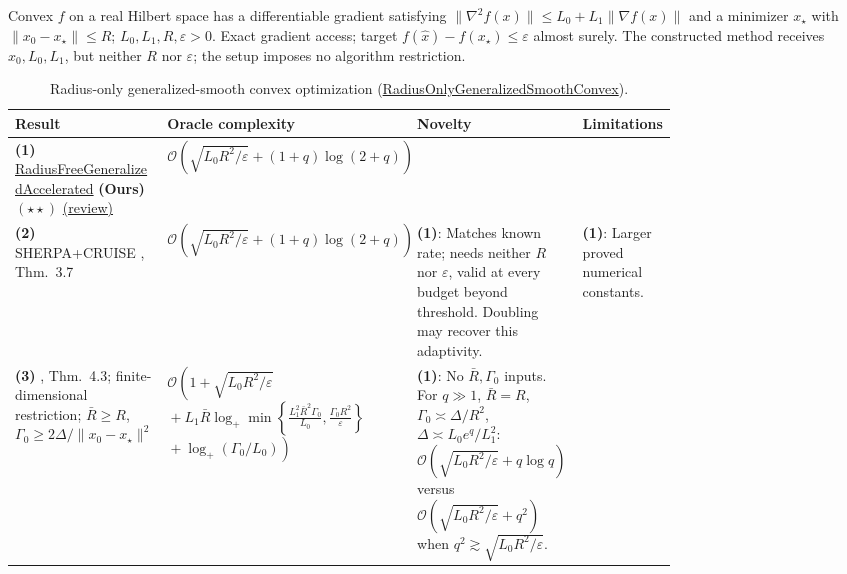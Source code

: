 \begin{table}[tp]
\centering
\caption{Radius-only generalized-smooth convex optimization (\href{https://github.com/k3nfalt/longtails/blob/main/LongTails/Setups/RadiusOnlyGeneralizedSmoothConvex.lean}{RadiusOnlyGeneralizedSmoothConvex}).}\label{tab:RadiusOnlyGeneralizedSmoothConvex}
\parbox{\linewidth}{\footnotesize Convex $f$ on a real Hilbert space has a differentiable gradient satisfying $\|\nabla^2 f(x)\|\le L_0+L_1\|\nabla f(x)\|$ and a minimizer $x_\star$ with $\|x_0-x_\star\|\le R$; $L_0,L_1,R,\varepsilon>0$. Exact gradient access; target $f(\hat x)-f(x_\star)\le\varepsilon$ almost surely. The constructed method receives $x_0,L_0,L_1$, but neither $R$ nor $\varepsilon$; the setup imposes no algorithm restriction.}\par\smallskip
\begin{threeparttable}
\footnotesize
\setlength{\tabcolsep}{4pt}\renewcommand{\arraystretch}{1.25}
\begin{tabularx}{\linewidth}{@{}>{\raggedright\arraybackslash}p{0.20\linewidth}>{\raggedright\arraybackslash}p{0.32\linewidth}>{\raggedright\arraybackslash}p{0.25\linewidth}>{\raggedright\arraybackslash}X@{}}
\toprule
\textbf{Result} & \textbf{Oracle complexity} & \textbf{Novelty} & \textbf{Limitations} \\
\midrule
\textbf{(1)} \href{https://github.com/k3nfalt/longtails/blob/main/LongTails/Theorems/RadiusFreeGeneralizedAccelerated.lean}{Radius\allowbreak Free\allowbreak Generalized\allowbreak Accelerated} \textbf{(Ours)} $(\star\star)$ \href{https://github.com/k3nfalt/longtails/blob/main/scripts/reviews/RadiusFreeGeneralizedAccelerated.md}{(review)} & $\mathcal{O}\!\left(\sqrt{L_0R^2/\varepsilon}+(1+q)\log(2+q)\right)$ & & \\
\midrule[1.2pt]
\textbf{(2)} SHERPA+CRUISE \citep{radiusEverestV1}, Thm.~3.7 & $\mathcal{O}\!\left(\sqrt{L_0R^2/\varepsilon}+(1+q)\log(2+q)\right)$ & \textbf{(1)}: Matches known rate; needs neither $R$ nor $\varepsilon$, valid at every budget beyond threshold. Doubling may recover this adaptivity. & \textbf{(1)}: Larger proved numerical constants. \\
\midrule
\textbf{(3)} \citep{radiusTyurinV2}, Thm.~4.3; finite-dimensional restriction; $\bar R\ge R$, $\Gamma_0\ge2\Delta/\|x_0-x_\star\|^2$ & $\mathcal{O}\!\left(1+\sqrt{L_0R^2/\varepsilon}\right.$\newline $\left.{}+L_1\bar R\log_+\!\min\!\left\{\frac{L_1^2\bar R^2\Gamma_0}{L_0},\frac{\Gamma_0R^2}{\varepsilon}\right\}\right.$\newline $\left.{}+\log_+(\Gamma_0/L_0)\right)$ & \textbf{(1)}: No $\bar R,\Gamma_0$ inputs. For $q\gg1$, $\bar R=R$, $\Gamma_0\asymp\Delta/R^2$, $\Delta\asymp L_0e^q/L_1^2$: $\mathcal{O}(\sqrt{L_0R^2/\varepsilon}+q\log q)$ versus $\mathcal{O}(\sqrt{L_0R^2/\varepsilon}+q^2)$ when $q^2\gtrsim\sqrt{L_0R^2/\varepsilon}$. &  \\

\end{tabularx}
\end{threeparttable}
\end{table}
